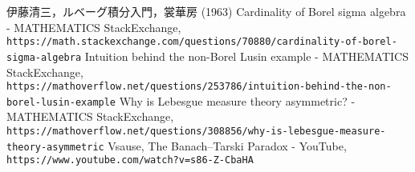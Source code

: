 \begin{thebibliography}{99}
	 伊藤清三，ルベーグ積分入門，裳華房 (1963)
	 Cardinality of Borel sigma algebra - MATHEMATICS StackExchange,\\
		\texttt{https://math.stackexchange.com/questions/70880/cardinality-of-borel-sigma-algebra}
	 Intuition behind the non-Borel Lusin example - MATHEMATICS StackExchange,\\
		\texttt{https://mathoverflow.net/questions/253786/intuition-behind-the-non-borel-lusin-example}
	 Why is Lebesgue measure theory asymmetric? - MATHEMATICS StackExchange,\\
		\texttt{https://mathoverflow.net/questions/308856/why-is-lebesgue-measure-theory-asymmetric}
	 Vsause, The Banach–Tarski Paradox - YouTube,
		\texttt{https://www.youtube.com/watch?v=s86-Z-CbaHA}
\end{thebibliography}
